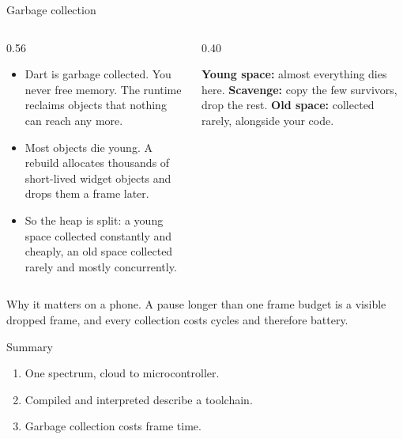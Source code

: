 \documentclass[10pt,aspectratio=169,t]{beamer}
\begin{document}
\begin{frame}[eyebrow=How code runs]{Garbage collection}
  \vskip 2mm
  \begin{columns}[T]
    \begin{column}{0.56\textwidth}
      \begin{itemize}
        \item Dart is garbage collected. You never free memory. The runtime reclaims objects that nothing can reach any more.
        \item Most objects die young. A rebuild allocates thousands of short-lived widget objects and drops them a frame later.
        \item So the heap is split: a young space collected constantly and cheaply, an old space collected rarely and mostly concurrently.
      \end{itemize}
    \end{column}
    \begin{column}{0.40\textwidth}
      \begin{hint}
        \textbf{Young space:} almost everything dies here. \textbf{Scavenge:} copy the few survivors, drop the rest. \textbf{Old space:} collected rarely, alongside your code.
      \end{hint}
    \end{column}
  \end{columns}
  \begin{takeaway}{Why it matters on a phone.}
    A pause longer than one frame budget is a visible dropped frame, and every collection costs cycles and therefore battery.
  \end{takeaway}
\end{frame}

\begin{frame}[eyebrow=Recap]{Summary}
  \vskip 2mm
  \begin{enumerate}
    \item One spectrum, cloud to microcontroller. 
    \item Compiled and interpreted describe a toolchain. 
    \item Garbage collection costs frame time. 
  \end{enumerate}
  \vskip 5mm
\end{frame}
\end{document}
